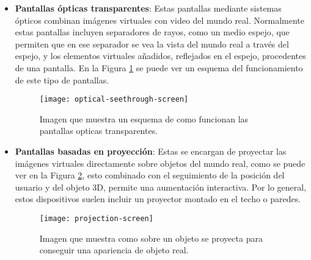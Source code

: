 \begin{itemize}
\begin{itemize}
\begin{itemize}
  \newpage

  \item \textbf{Pantallas ópticas transparentes}: Estas pantallas mediante sistemas ópticos combinan imágenes virtuales con video del mundo real. Normalmente estas pantallas incluyen separadores de rayos, como un medio espejo, que permiten que en ese separador se vea la vista del mundo real a través del espejo, y los elementos virtuales añadidos, reflejados en el espejo, procedentes de una pantalla. En la Figura \ref{figura-pantalla-optica} se puede ver un esquema del funcionamiento de este tipo de pantallas.

  \begin{figure}[h]
    \centering
    \texttt{[image: optical-seethrough-screen]}
    \caption{Imagen que muestra un esquema de como funcionan las pantallas opticas transparentes.\protect\footnotemark}
    \label{figura-pantalla-optica}
  \end{figure}


  \newpage

  \item \textbf{Pantallas basadas en proyección}: Estas se encargan de proyectar las imágenes virtuales directamente sobre objetos del mundo real, como se puede ver en la Figura \ref{figura-pantalla-proyeccion}, esto combinado con el seguimiento de la posición del usuario y del objeto 3D, permite una aumentación interactiva. Por lo general, estos dispositivos suelen incluir un proyector montado en el techo o paredes.

  \begin{figure}[h]
    \centering
    \texttt{[image: projection-screen]}
    \caption{Imagen que muestra como sobre un objeto se proyecta para conseguir una apariencia de objeto real.\protect\footnotemark}
    \label{figura-pantalla-proyeccion}
  \end{figure}



\end{itemize}
\end{itemize}
\end{itemize}

